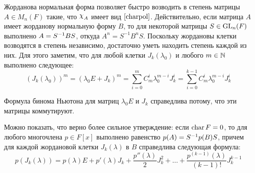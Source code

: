 \begin{note}
	Жорданова нормальная форма позволяет быстро возводить в степень матрицы $A \in M_n(F)$ такие, что $\Chi_A$ имеет вид $\eqref*{charpol}$. Действительно, если матрица $A$ имеет жорданову нормальную форму $B$, то для некоторой матрицы $S \in \operatorname{GL}_n(F)$ выполнено $A \hm{=} S^{-1}BS$, откуда $A^n = S^{-1}B^nS$. Поскольку жордановы клетки возводятся в степень независимо, достаточно уметь находить степень каждой из них. Для этого заметим, что для любой клетки $J_k(\lambda_0)$ и любого $m \in \mathbb{N}$ выполнено следующее:
	\[(J_k(\lambda_0))^m = (\lambda_0E + J_k)^m = \sum_{i = 0}^mC_m^i\lambda_0^{m - i}J_k^i = \sum_{i = 0}^{k - 1}C_m^i\lambda_0^{m - i}J_k^i\]
	
	Формула бинома Ньютона для матриц $\lambda_0 E$ и $J_k$ справедлива потому, что эти матрицы коммутируют.
\end{note}

\begin{note}
	Можно показать, что верно более сильное утверждение: если $\operatorname{char}{F} = 0$, то для любого многочлена $p \in F[x]$ выполнено равенство $p(A) \hm{=} S^{-1}p(B)S$, причем для каждой жордановой клетки $J_k(\lambda)$ в $B$ справедлива следующая формула:
	\[p(J_k(\lambda)) = p(\lambda)E + p'(\lambda)J_k + \frac{p''(\lambda)}{2}J_k^2 + \dots + \frac{p^{(k-1)}(\lambda)}{(k-1)!}J_k^{k-1}\]
\end{note}